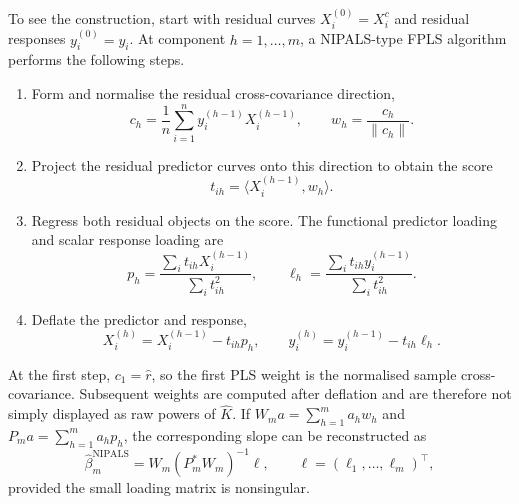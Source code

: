 To see the construction, start with residual curves
$X_i^{(0)}=X_i^c$ and residual responses $y_i^{(0)}=y_i$.  At component
$h=1,\ldots,m$, a NIPALS-type FPLS algorithm performs the following steps.
\begin{enumerate}
    \item Form and normalise the residual cross-covariance direction,
    \begin{equation}
        c_h=\frac1n\sum_{i=1}^{n}y_i^{(h-1)}X_i^{(h-1)},
        \qquad
        w_h=\frac{c_h}{\|c_h\|}.
        \label{eq:methods-nipals-weight}
    \end{equation}

    \item Project the residual predictor curves onto this direction to obtain
    the score
    \begin{equation}
        t_{ih}=\langle X_i^{(h-1)},w_h\rangle.
        \label{eq:methods-nipals-score}
    \end{equation}

    \item Regress both residual objects on the score.  The functional
    predictor loading and scalar response loading are
    \begin{equation}
        p_h=\frac{\sum_i t_{ih}X_i^{(h-1)}}{\sum_i t_{ih}^2},
        \qquad
        \ell_h=\frac{\sum_i t_{ih}y_i^{(h-1)}}{\sum_i t_{ih}^2}.
        \label{eq:methods-nipals-loadings}
    \end{equation}

    \item Deflate the predictor and response,
    \begin{equation}
        X_i^{(h)}=X_i^{(h-1)}-t_{ih}p_h,
        \qquad
        y_i^{(h)}=y_i^{(h-1)}-t_{ih}\ell_h.
        \label{eq:methods-nipals-deflation}
    \end{equation}
\end{enumerate}
At the first step, $c_1=\widehat r$, so the first PLS weight is the
normalised sample cross-covariance.  Subsequent weights are computed after
deflation and are therefore not simply displayed as raw powers of
$\widehat K$.  If $W_m a=\sum_{h=1}^{m}a_hw_h$ and
$P_m a=\sum_{h=1}^{m}a_hp_h$, the corresponding slope can be reconstructed
as
\begin{equation}
    \widehat\beta_m^{\mathrm{NIPALS}}
    =W_m(P_m^*W_m)^{-1}\ell,
    \qquad \ell=(\ell_1,\ldots,\ell_m)^\top,
    \label{eq:methods-nipals-slope}
\end{equation}
provided the small loading matrix is nonsingular.

